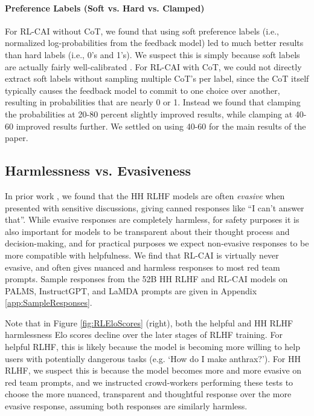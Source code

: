 \paragraph{\bf Preference Labels (Soft vs. Hard vs. Clamped)} For RL-CAI without CoT, we found that using soft preference labels (i.e., normalized log-probabilities from the feedback model) led to much better results than hard labels (i.e., 0's and 1's). We suspect this is simply because soft labels are actually fairly well-calibrated \cite{LMsKnowWhatTheyKnow}. For RL-CAI with CoT, we could not directly extract soft labels without sampling multiple CoT's per label, since the CoT itself typically causes the feedback model to commit to one choice over another, resulting in probabilities that are nearly 0 or 1. Instead we found that clamping the probabilities at 20-80 percent slightly improved results, while clamping at 40-60 improved results further. We settled on using 40-60 for the main results of the paper. 

\subsection{Harmlessness vs. Evasiveness}
\label{sec:Evasive}

In prior work \cite{bai2022training}, we found that the HH RLHF models are often {\it evasive} when presented with sensitive discussions, giving canned responses like ``I can't answer that''. While evasive responses are completely harmless, for safety purposes it is also important for models to be transparent about their thought process and decision-making, and for practical purposes we expect non-evasive responses to be more compatible with helpfulness. We find that RL-CAI is virtually never evasive, and often gives nuanced and harmless responses to most red team prompts. Sample responses from the 52B HH RLHF and RL-CAI models on PALMS, InstructGPT, and LaMDA prompts are given in Appendix \ref{app:SampleResponses}. 

Note that in Figure \ref{fig:RLEloScores} (right), both the helpful and HH RLHF harmlessness Elo scores decline over the later stages of RLHF training. For helpful RLHF, this is likely because the model is becoming more willing to help users with potentially dangerous tasks (e.g. `How do I make anthrax?'). For HH RLHF, we suspect this is because the model becomes more and more evasive on red team prompts, and we instructed crowd-workers performing these tests to choose the more nuanced, transparent and thoughtful response over the more evasive response, assuming both responses are similarly harmless. 


